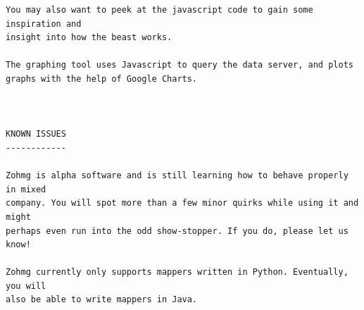 \begin{verbatim}
You may also want to peek at the javascript code to gain some inspiration and
insight into how the beast works.

The graphing tool uses Javascript to query the data server, and plots
graphs with the help of Google Charts.



KNOWN ISSUES
------------

Zohmg is alpha software and is still learning how to behave properly in mixed
company. You will spot more than a few minor quirks while using it and might
perhaps even run into the odd show-stopper. If you do, please let us know!

Zohmg currently only supports mappers written in Python. Eventually, you will
also be able to write mappers in Java.
\end{verbatim}


